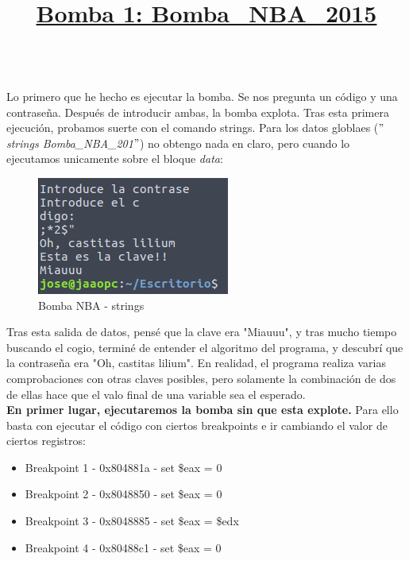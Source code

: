 \documentclass[11pt,a4paper]{article}
\begin{document}
\title{\large{\textbf{\underline{Bomba 1: Bomba\_NBA\_2015}}}} \\

Lo primero que he hecho es ejecutar la bomba. Se nos pregunta un código y una contraseña. Después de introducir ambas, la bomba explota. Tras esta primera ejecución, probamos suerte con el comando strings. Para los datos globlaes (\emph{$"$strings Bomba\_NBA\_201$"$}) no obtengo nada en claro, pero cuando lo ejecutamos unicamente sobre el bloque \emph{data}: \\

\begin{figure}[H] 
	\centering
	\includegraphics[scale=0.45]{capturas/nba1.png} 
	\caption{Bomba NBA - strings} \label{fig:figura25}
\end{figure}

Tras esta salida de datos, pensé que la clave era "Miauuu", y tras mucho tiempo buscando el cogio, terminé de entender el algoritmo del programa, y descubrí que la contraseña era "Oh, castitas lilium". En realidad, el programa realiza varias comprobaciones con otras claves posibles, pero solamente la combinación de dos de ellas hace que el valo final de una variable sea el esperado. \\

\textbf{En primer lugar, ejecutaremos la bomba sin que esta explote.} Para ello basta con ejecutar el código con ciertos breakpoints e ir cambiando el valor de ciertos registros:

\begin{itemize}
	\item Breakpoint 1 - 0x804881a - set \$eax = 0
	\item Breakpoint 2 - 0x8048850 - set \$eax = 0
	\item Breakpoint 3 - 0x8048885 - set \$eax = \$edx
	\item Breakpoint 4 - 0x80488c1 - set \$eax = 0
\end{itemize}
\end{document}
